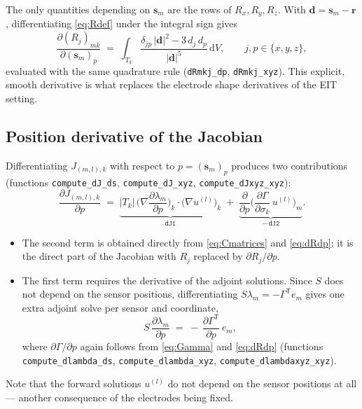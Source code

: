 \documentclass[11pt,a4paper]{article}
\newcommand{\dd}{\mathrm{d}}
\newcommand{\T}{\mathsf{T}}
\newcommand{\sensor}[1]{\bm{s}_{#1}}
\newcommand{\code}[1]{\texttt{#1}}
\begin{document}
The only quantities depending on $\sensor{m}$ are the rows of $R_x, R_y, R_z$. With
$\bm{d} = \sensor{m} - \bm{r}$, differentiating \eqref{eq:Rdef} under the integral sign gives
\begin{equation}
\label{eq:dRdp}
  \frac{\partial (R_j)_{mk}}{\partial (\sensor{m})_p}
  \;=\;
  \int_{T_k} \frac{\delta_{jp}\, |\bm{d}|^2 - 3\, d_j\, d_p}{|\bm{d}|^5}\, \dd V ,
  \qquad j,p \in \{x,y,z\},
\end{equation}
evaluated with the same quadrature rule (\code{dRmkj\_dp}, \code{dRmkj\_xyz}). This explicit,
smooth derivative is what replaces the electrode shape derivatives of the EIT setting.

\subsection{Position derivative of the Jacobian}

Differentiating $J_{(m,l),k}$ with respect to $p = (\sensor{m})_p$ produces two contributions
(functions \code{compute\_dJ\_ds}, \code{compute\_dJ\_xyz}, \code{compute\_dJxyz\_xyz}):
\begin{equation}
\label{eq:dJ}
  \frac{\partial J_{(m,l),k}}{\partial p}
  \;=\;
  \underbrace{|T_k| \,
    \Big(\nabla \frac{\partial \lambda_m}{\partial p}\Big)_{\!k} \cdot \big(\nabla u^{(l)}\big)_k}_{\code{dJ1}}
  \;+\;
  \underbrace{\frac{\partial}{\partial p}
    \Big( \frac{\partial \Gamma}{\partial \sigma_k}\, u^{(l)} \Big)_{\!m}}_{-\,\code{dJ2}} .
\end{equation}
\begin{itemize}
  \item The second term is obtained directly from \eqref{eq:Cmatrices} and \eqref{eq:dRdp}: it is
        the direct part of the Jacobian with $R_j$ replaced by $\partial R_j / \partial p$.
  \item The first term requires the derivative of the adjoint solutions. Since $S$ does not
        depend on the sensor positions, differentiating $S\lambda_m = -\Gamma^\T e_m$ gives one
        extra adjoint solve per sensor and coordinate,
        \begin{equation}
          S\, \frac{\partial \lambda_m}{\partial p}
          \;=\;
          -\, \frac{\partial \Gamma^\T}{\partial p}\, e_m ,
        \end{equation}
        where $\partial \Gamma / \partial p$ again follows from \eqref{eq:Gamma} and
        \eqref{eq:dRdp} (functions \code{compute\_dlambda\_ds}, \code{compute\_dlambda\_xyz},
        \code{compute\_dlambdaxyz\_xyz}).
\end{itemize}
Note that the forward solutions $u^{(l)}$ do not depend on the sensor positions at all --- another
consequence of the electrodes being fixed.
\end{document}
